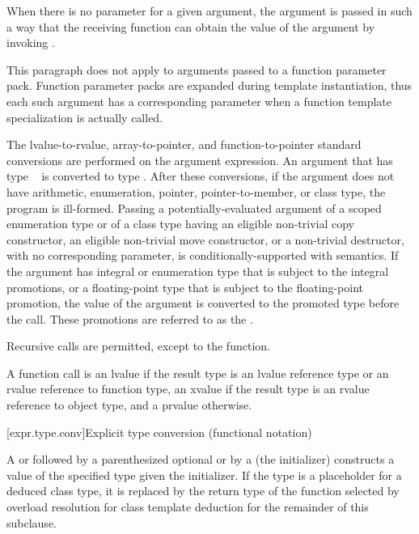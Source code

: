 \pnum
{}%
When there is no parameter for a given argument, the argument is passed
in such a way that the receiving function can obtain the value of the
argument by invoking .
\begin{note}
This paragraph does not apply to arguments passed to a function parameter pack.
Function parameter packs are expanded during template instantiation,
thus each such argument has a corresponding parameter when a function template
specialization is actually called.
\end{note}
The
lvalue-to-rvalue, array-to-pointer,
and function-to-pointer standard conversions are
performed on the argument expression.
An argument that has type \cv{}~ is converted
to type .
After these conversions, if the
argument does not have arithmetic, enumeration, pointer, pointer-to-member,
or class type, the program is ill-formed. Passing a potentially-evaluated
argument
of a scoped enumeration type or
of a class type having an eligible non-trivial
copy constructor, an eligible non-trivial move constructor,
or a
non-trivial destructor,
with no corresponding parameter, is conditionally-supported with
 semantics. If the argument has
integral or enumeration type that is subject to the integral
promotions, or a floating-point type that is subject to the
floating-point promotion, the value of the argument is converted to the
promoted type before the call. These promotions are referred to as
the .

\pnum
{}%
Recursive calls are permitted, except to the 
function.

\pnum
A function call is an lvalue
if the result type is an lvalue reference type or an rvalue reference to function type,
an xvalue if the result type is an rvalue reference to object type, and a prvalue
otherwise.

[expr.type.conv]{Explicit type conversion (functional notation)}

\pnum
{}%
%
%
%
%
A  or
 followed
by a parenthesized optional  or
by a 
(the initializer)
constructs a value of the specified type
given the initializer.
%
If the type is a placeholder
for a deduced class type,
it is replaced by the return type
of the function selected by overload resolution
for class template deduction
for the remainder of this subclause.

